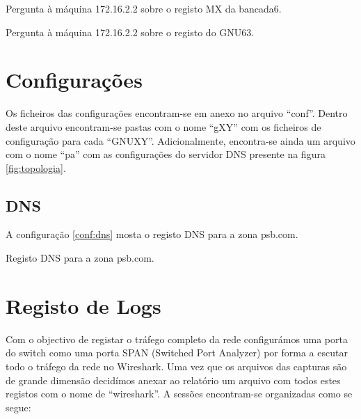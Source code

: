 \documentclass[a4paper,12pt]{article}
\begin{document}
\begin{program}
	
  \caption{Pergunta à máquina 172.16.2.2 sobre o registo MX da bancada6.}
	\label{log:172mx}
\end{program}

\begin{program}
	
  \caption{Pergunta à máquina 172.16.2.2 sobre o registo do GNU63.}
	\label{log:172a}
\end{program}


\section{Configurações}

Os ficheiros das configurações encontram-se em anexo no arquivo ``conf''.
Dentro deste arquivo encontram-se pastas com o nome ``gXY'' com os ficheiros
de configuração para cada ``GNUXY''. Adicionalmente, encontra-se ainda um
arquivo com o nome ``pa'' com as configurações do servidor DNS presente na 
figura \ref{fig:topologia}.

\subsection{DNS}

A configuração \ref{conf:dns} mosta o registo DNS para a zona psb.com.

\begin{config}
	
  \caption{Registo DNS para a zona psb.com.}
	\label{conf:dns}
\end{config}


\section{Registo de Logs}

Com o objectivo de registar o tráfego completo da rede configurámos uma porta
do switch como uma porta SPAN (Switched Port Analyzer) por forma a escutar todo
o tráfego da rede no Wireshark.
Uma vez que os arquivos das capturas são de grande dimensão decidímos anexar 
ao relatório um arquivo com todos estes registos com o nome de ``wireshark''. 
A sessões encontram-se organizadas como se segue:
\end{document}
